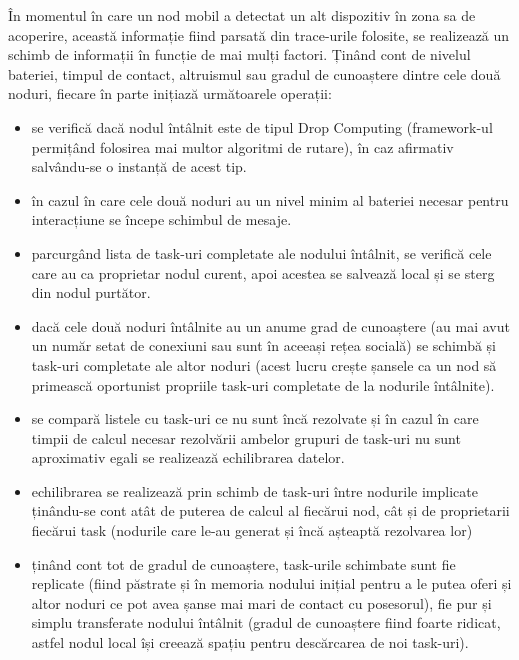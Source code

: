 \documentclass[12pt,a4paper]{report}
\begin{document}
În momentul în care un nod mobil a detectat un alt dispozitiv în zona sa de acoperire, această informație fiind parsată din trace-urile folosite, se realizează un schimb de informații în funcție de mai mulți factori. Ținând cont de nivelul bateriei, timpul de contact, altruismul sau gradul de cunoaștere dintre cele două noduri, fiecare în parte inițiază următoarele operații:
\begin{itemize}
	\item se verifică dacă nodul întâlnit este de tipul Drop Computing (framework-ul permițând folosirea mai multor algoritmi de rutare), în caz afirmativ salvându-se o instanță de acest tip.
	\item în cazul în care cele două noduri au un nivel minim al bateriei necesar pentru interacțiune se începe schimbul de mesaje.
	\item parcurgând lista de task-uri completate ale nodului întâlnit, se verifică cele care au ca proprietar nodul curent, apoi acestea se salvează local și se sterg din nodul purtător.
	\item dacă cele două noduri întâlnite au un anume grad de cunoaștere (au mai avut un număr setat de conexiuni sau sunt în aceeași rețea socială) se schimbă și task-uri completate ale altor noduri (acest lucru crește șansele ca un nod să primească oportunist propriile task-uri completate de la nodurile întâlnite).
	\item se compară listele cu task-uri ce nu sunt încă rezolvate și în cazul în care timpii de calcul necesar rezolvării ambelor grupuri de task-uri nu sunt aproximativ egali se realizează echilibrarea datelor.
	\item echilibrarea se realizează prin schimb de task-uri între nodurile implicate ținându-se cont atât de puterea de calcul al fiecărui nod, cât și de proprietarii fiecărui task (nodurile care le-au generat și încă așteaptă rezolvarea lor)
	\item ținând cont tot de gradul de cunoaștere, task-urile schimbate sunt fie replicate (fiind păstrate și în memoria nodului inițial pentru a le putea oferi și altor noduri ce pot avea șanse mai mari de contact cu posesorul), fie pur și simplu transferate nodului întâlnit (gradul de cunoaștere fiind foarte ridicat, astfel nodul local își creează spațiu pentru descărcarea de noi task-uri).
\end{itemize}
\end{document}
